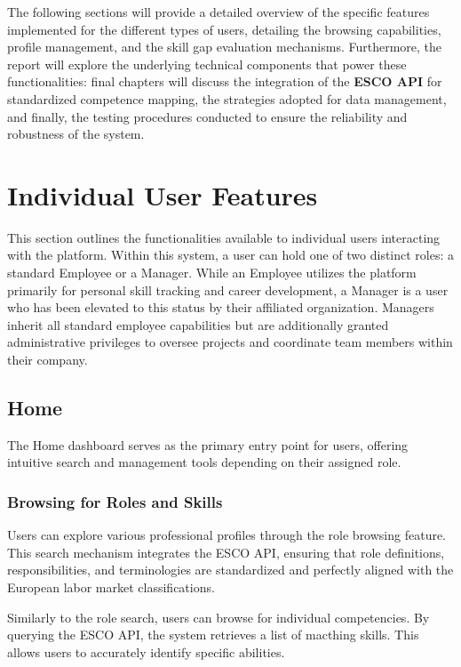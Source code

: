 \documentclass{article}
\begin{document}
The following sections will provide a detailed overview of the specific features implemented for the 
different types of users, detailing the browsing capabilities, profile management, 
and the skill gap evaluation mechanisms. Furthermore, the report will explore 
the underlying technical components that power these functionalities: 
final chapters will discuss the integration of the \textbf{ESCO API} for standardized 
competence mapping, the strategies adopted for data management, and finally, the testing procedures conducted to 
ensure the reliability and robustness of the system.

\newpage

\section{Individual User Features}
This section outlines the functionalities available to individual users interacting 
with the platform. Within this system, a user can hold one of two distinct roles: 
a standard Employee or a Manager. While an Employee utilizes the platform primarily 
for personal skill tracking and career development, a Manager is a user who has been 
elevated to this status by their affiliated organization. Managers inherit all standard 
employee capabilities but are additionally granted administrative privileges to 
oversee projects and coordinate team members within their company.

\subsection{Home}
The Home dashboard serves as the primary entry point for users, offering intuitive 
search and management tools depending on their assigned role.

\subsubsection{Browsing for Roles and Skills}
Users can explore various professional profiles through the role browsing feature. 
This search mechanism integrates the ESCO API, ensuring that role definitions, 
responsibilities, and terminologies are standardized and perfectly aligned with 
the European labor market classifications.

Similarly to the role search, users can browse for individual competencies. 
By querying the ESCO API, the system retrieves a list of macthing skills. 
This allows users to accurately identify specific 
abilities.
\end{document}
